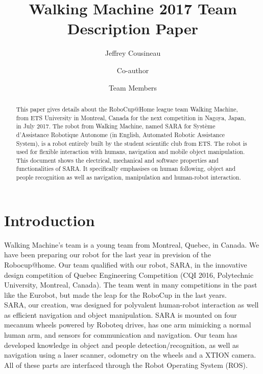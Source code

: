 \documentclass[runningheads,a4paper]{llncs}
\begin{document}
\title{Walking Machine 2017 Team Description Paper}

\author{Jeffrey Cousineau \and Co-author \and Team Members }
\maketitle



\begin{abstract}

This paper gives details about the RoboCup@Home league team Walking Machine, from ETS University in Montreal, Canada for the next competition in Nagoya, Japan, in July 2017. The robot from Walking Machine, named SARA for Système d’Assistance Robotique Autonome (in English, Automated Robotic Assistance System), is a robot entirely built by the student scientific club from ETS. The robot is used for flexible interaction with humans, navigation and mobile
object manipulation. This document shows the electrical, mechanical and software properties and functionalities of SARA. It specifically emphasises on human following, object and people recognition as well as navigation, manipulation and human-robot interaction.

\end{abstract}



\section{Introduction}
Walking Machine’s team is a young team from Montreal, Quebec, in Canada. We have been preparing our robot for the last year in prevision of the Robocup@home. Our team qualified with our robot, SARA, in the innovative design competition of Quebec Engineering Competition (CQI 2016, Polytechnic University, Montreal, Canada). The team went in many competitions in the past like the Eurobot, but made the leap for the RoboCup in the last years. \\

SARA, our creation, was designed for polyvalent human-robot interaction as well as efficient navigation and object manipulation. SARA is mounted on four mecanum wheels powered by Roboteq drives, has one arm mimicking a normal human arm, and sensors for communication and navigation. Our team has developed knowledge in object and people detection/recognition, as well as navigation using a laser scanner, odometry on the wheels and a XTION camera. All of these parts are interfaced through the Robot Operating System (ROS). \\
\end{document}
